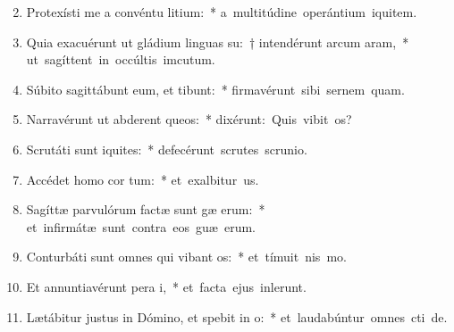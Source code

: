 \begin{flushleft}
\begin{enumerate}[leftmargin=*]
\setcounter{enumi}{1}


\item Protexísti me a convéntu litium:~* \mbox{a multitúdine operántium iquitem.}
\item Quia exacuérunt ut gládium linguas su:~† intendérunt arcum  aram,~* \mbox{ut sagíttent in occúltis imcutum.}
\item Súbito sagittábunt eum, et  tibunt:~* \mbox{firmavérunt sibi sernem quam.}
\item Narravérunt ut abderent queos:~* \mbox{dixérunt: Quis vibit os?}
\item Scrutáti sunt iquites:~* \mbox{defecérunt scrutes scrunio.}
\item Accédet homo  cor tum:~* \mbox{et exalbitur us.}
\item Sagíttæ parvulórum factæ sunt gæ erum:~* \mbox{et infirmátæ sunt contra eos guæ erum.}
\item Conturbáti sunt omnes qui vibant os:~* \mbox{et tímuit nis mo.}
\item Et annuntiavérunt pera i,~* \mbox{et facta ejus inlerunt.}
\item Lætábitur justus in Dómino, et spebit in o:~* \mbox{et laudabúntur omnes cti de.}

\end{enumerate}
\end{flushleft}

